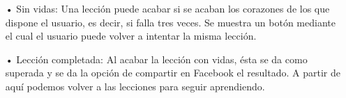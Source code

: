 \begin{itemize}

\item[•]Sin vidas: Una lección puede acabar si se acaban los corazones de los que dispone el usuario, es decir, si falla tres veces. Se muestra un botón mediante el cual el usuario puede volver a intentar la misma lección.

\begin{figure}[H]
\begin{center}
\end{center}
\end{figure}

\item[•]Lección completada: Al acabar la lección con vidas, ésta se da como superada y se da la opción de compartir en Facebook el resultado. A partir de aquí podemos volver a las lecciones para seguir aprendiendo.

\begin{figure}[H]
\begin{center}
\end{center}
\end{figure}


\end{itemize}
